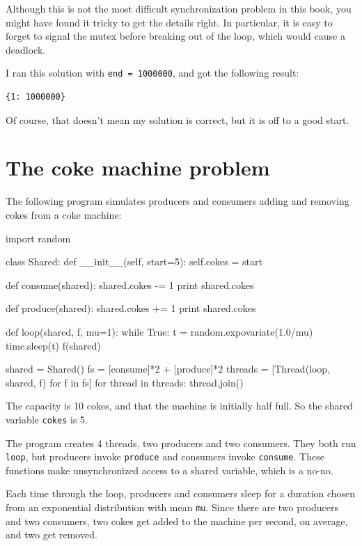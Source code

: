 \documentclass{book}
\begin{document}
Although this is not the most difficult synchronization problem
in this book, you might have found it tricky to get the details
right.  In particular, it is easy to forget to signal the mutex
before breaking out of the loop, which would cause a deadlock.

I ran this solution with {\tt end = 1000000}, and got the
following result:

\begin{verbatim}
{1: 1000000}
\end{verbatim}

Of course, that doesn't mean my solution is correct, but it is
off to a good start.



\section {The coke machine problem}

The following program simulates producers and consumers
adding and removing cokes from a coke machine:
\begin{unbreakable}[title={}]{}
import random

class Shared:
    def __init__(self, start=5):
        self.cokes = start

def consume(shared):
    shared.cokes -= 1
    print shared.cokes

def produce(shared):
    shared.cokes += 1
    print shared.cokes

def loop(shared, f, mu=1):
    while True:
        t = random.expovariate(1.0/mu)
        time.sleep(t)
        f(shared)

shared = Shared()
fs = [consume]*2 + [produce]*2 
threads = [Thread(loop, shared, f) 
  for f in fs]
for thread in threads: thread.join()
\end{unbreakable}

The capacity is 10 cokes, and that the machine is initially
half full.  So the shared variable {\tt cokes} is 5.

The program creates 4 threads, two producers and two consumers.
They both run {\tt loop}, but producers invoke {\tt produce}
and consumers invoke {\tt consume}.  These functions make
unsynchronized access to a shared variable, which is a no-no.

Each time through the loop, producers and consumers sleep for a
duration chosen from an exponential distribution with mean {\tt mu}.
Since there are two producers and two consumers, two cokes get added
to the machine per second, on average, and two get removed.
\end{document}
